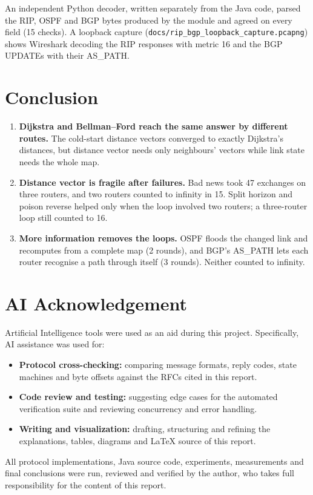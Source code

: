 \documentclass[11pt,a4paper]{article}
\begin{document}
\noindent An independent Python decoder, written separately from the Java code, parsed the RIP, OSPF and BGP bytes produced by the module and agreed on every field (15 checks). A loopback capture (\texttt{docs/rip\_bgp\_loopback\_capture.pcapng}) shows Wireshark decoding the RIP responses with metric 16 and the BGP UPDATEs with their AS\_PATH.

\section{Conclusion}
\begin{enumerate}[leftmargin=2em]
    \item \textbf{Dijkstra and Bellman--Ford reach the same answer by different routes.} The cold-start distance vectors converged to exactly Dijkstra's distances, but distance vector needs only neighbours' vectors while link state needs the whole map.
    \item \textbf{Distance vector is fragile after failures.} Bad news took 47 exchanges on three routers, and two routers counted to infinity in 15. Split horizon and poison reverse helped only when the loop involved two routers; a three-router loop still counted to 16.
    \item \textbf{More information removes the loops.} OSPF floods the changed link and recomputes from a complete map (2 rounds), and BGP's AS\_PATH lets each router recognise a path through itself (3 rounds). Neither counted to infinity.
\end{enumerate}

\section*{AI Acknowledgement}
Artificial Intelligence tools were used as an aid during this project. Specifically, AI assistance was used for:
\begin{itemize}[leftmargin=2em]
    \item \textbf{Protocol cross-checking:} comparing message formats, reply codes, state machines and byte offsets against the RFCs cited in this report.
    \item \textbf{Code review and testing:} suggesting edge cases for the automated verification suite and reviewing concurrency and error handling.
    \item \textbf{Writing and visualization:} drafting, structuring and refining the explanations, tables, diagrams and \LaTeX{} source of this report.
\end{itemize}
All protocol implementations, Java source code, experiments, measurements and final conclusions were run, reviewed and verified by the author, who takes full responsibility for the content of this report.
\end{document}
